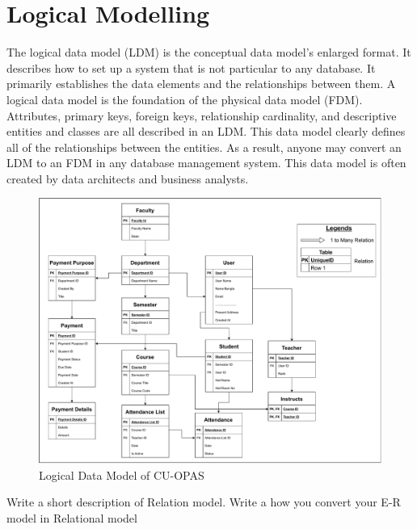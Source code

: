 \section{Logical Modelling}\label{sec:lm}
The logical data model (LDM) is the conceptual data model's enlarged format. It describes how to set up a system that is not particular to any database. It primarily establishes the data elements and the relationships between them. A logical data model is the foundation of the physical data model (FDM). Attributes, primary keys, foreign keys, relationship cardinality, and descriptive entities and classes are all described in an LDM. This data model clearly defines all of the relationships between the entities. As a result, anyone may convert an LDM to an FDM in any database management system. This data model is often created by data architects and business analysts.\\

\begin{figure}[H]
    \centering
    \includegraphics[width=1\textwidth]{images/logical}
    \caption{Logical Data Model of CU-OPAS}
    \label{fig:logical}
\end{figure}

Write a short description of Relation model. 
Write a how you convert your E-R model in Relational model
\clearpage